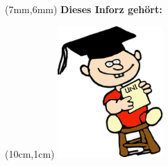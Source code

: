 \thispagestyle{empty}

\begin{textblock*}{10cm}(7mm,6mm)
    \normalsize \textbf{Dieses Inforz gehört:}
\end{textblock*}

\begin{textblock*}{4cm}(10cm,1cm)
    \includegraphics[width=4cm]{../grafik/wesen/wesen_uni}
\end{textblock*}
